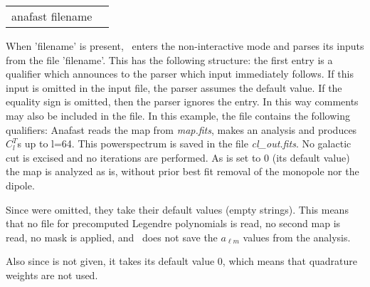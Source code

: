 \begin{examples}{2}
{%
\begin{tabular}{ll} %
anafast  filename \\
\end{tabular}%
}
{When 'filename' is present, \thedocid\ enters the non-interactive mode and parses
its inputs from the file 'filename'. This has the following
structure: the first entry is a qualifier which announces to the parser
which input immediately follows. If this input is omitted in the
input file, the parser assumes the default value.
If the equality sign is omitted, then the parser ignores the entry.
In this way comments may also be included in the file.
In this example, the file contains the following qualifiers:\hfill\newline
{}
Anafast reads the map from {\em map.fits}, makes an analysis and produces $C^T_l$s up to l=64.
This powerspectrum is saved in the file {\em cl\_out.fits}. 
No galactic cut is excised and no iterations are performed.
As %
 is set to 0 (its default value) the map is analyzed as
is, without prior best fit removal of the monopole nor the dipole.

Since\hfill\newline
{}
were omitted, they take their default values (empty strings). 
This means that no file for precomputed
Legendre polynomials is read, no second map is read, no mask is applied, and \thedocid\ does not save the $a_{\ell m}$ values
from the analysis.

Also since\hfill\newline
{}
is not given, it takes its default value 0, which means that quadrature 
weights are not used.

}
\end{examples}

